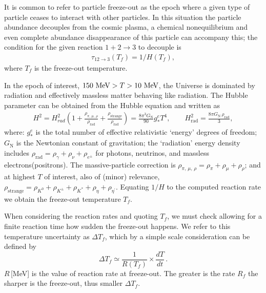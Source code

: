 It is common to refer to particle freeze-out as the epoch where a given type of particle ceases to interact with other particles. In this situation the particle abundance decouples from the cosmic plasma, a chemical nonequilibrium and even complete abundance disappearance of this particle can accompany this; the condition for the given reaction $1+2\rightarrow 3$ to decouple is
\begin{align}
\tau_{12\rightarrow 3}(T_f)=1/H(T_f),
\end{align}
where $T_f$ is the freeze-out temperature.

In the epoch of interest, $150\text{ MeV}>T>10\text{ MeV}$, the Universe is dominated by radiation and effectively massless matter behaving like radiation. The Hubble parameter can be obtained from the Hubble equation and written as~\cite{Kolb:1990vq}
\begin{align}\label{H2g}
H^2=H^2_{rad}\left(1+\frac{\rho_{\pi,\,\mu,\,\rho}}{\rho_\mathrm{rad}}+\frac{\rho_\mathrm{strange}}{\rho_\mathrm{rad}}\right)=\frac{8\pi^3G_\mathrm{N}}{90}g^e_\ast T^4,\qquad H^2_\mathrm{rad}=\frac{8\pi G_\mathrm{N}\,\rho_\mathrm{rad}}{3},
\end{align}
where: $g^e_\ast$ is the total number of effective relativistic `energy' degrees of freedom; $G_\mathrm{N}$ is the Newtonian constant of gravitation; the `radiation' energy density includes $\rho_\mathrm{rad}=\rho_\gamma+\rho_\nu+\rho_{e^\pm}$ for photons, neutrinos, and massless electrons(positrons). The massive-particle correction is $\rho_{\pi,\,\mu,\,\rho}=\rho_\pi+\rho_\mu+\rho_\rho$; and at highest $T$ of interest, also of (minor) relevance, $\rho_\mathrm{strange}=\rho_{K^0}+\rho_{K^\pm}+\rho_{K^\ast}+\rho_{\eta}+\rho_{\eta^\prime}$.
Equating $1/H$ to the computed reaction rate we obtain the freeze-out temperature $T_f$. 

When considering the reaction rates and quoting $T_f$,   we must check allowing for a finite reaction time how sudden the freeze-out happens. We refer to this temperature uncertainty as  $\Delta T_f$, which by a simple scale consideration can be defined by
\begin{equation}\label{eq:DeltaT}
\Delta T_f\simeq \frac{1}{R(T_f)}\times \frac{dT}{dt}\,. 
\end{equation}
$R$\,[MeV] is the value of reaction rate at freeze-out. The greater is the rate $R_f$ the sharper is the freeze-out, thus smaller $\Delta T_f$.


